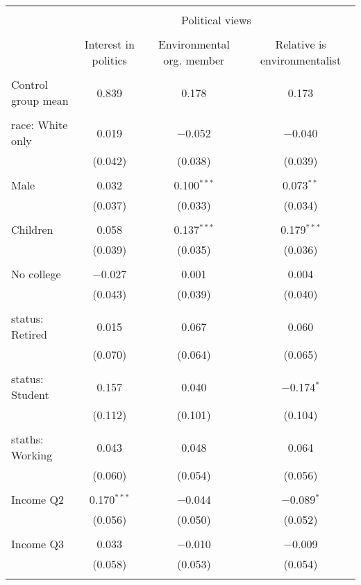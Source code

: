 
\begin{tabular}{@{\extracolsep{5pt}}lccc} 
\\[-1.8ex]\hline 
\hline \\[-1.8ex] 
 & \multicolumn{3}{c}{Political views} \\ 
\cline{2-4} 
\\[-1.8ex] & Interest in politics & Environmental org. member & Relative is environmentalist \\ 
\hline \\[-1.8ex] 
 Control group mean & 0.839 & 0.178 & 0.173  \\ \hline \\[-1.8ex] race: White only & 0.019 & $-$0.052 & $-$0.040 \\ 
  & (0.042) & (0.038) & (0.039) \\ 
  & & & \\ 
 Male & 0.032 & 0.100$^{***}$ & 0.073$^{**}$ \\ 
  & (0.037) & (0.033) & (0.034) \\ 
  & & & \\ 
 Children & 0.058 & 0.137$^{***}$ & 0.179$^{***}$ \\ 
  & (0.039) & (0.035) & (0.036) \\ 
  & & & \\ 
 No college & $-$0.027 & 0.001 & 0.004 \\ 
  & (0.043) & (0.039) & (0.040) \\ 
  & & & \\ 
 status: Retired & 0.015 & 0.067 & 0.060 \\ 
  & (0.070) & (0.064) & (0.065) \\ 
  & & & \\ 
 status: Student & 0.157 & 0.040 & $-$0.174$^{*}$ \\ 
  & (0.112) & (0.101) & (0.104) \\ 
  & & & \\ 
 staths: Working & 0.043 & 0.048 & 0.064 \\ 
  & (0.060) & (0.054) & (0.056) \\ 
  & & & \\ 
 Income Q2 & 0.170$^{***}$ & $-$0.044 & $-$0.089$^{*}$ \\ 
  & (0.056) & (0.050) & (0.052) \\ 
  & & & \\ 
 Income Q3 & 0.033 & $-$0.010 & $-$0.009 \\ 
  & (0.058) & (0.053) & (0.054) \\ 
  & & & \\ 

\end{tabular}
